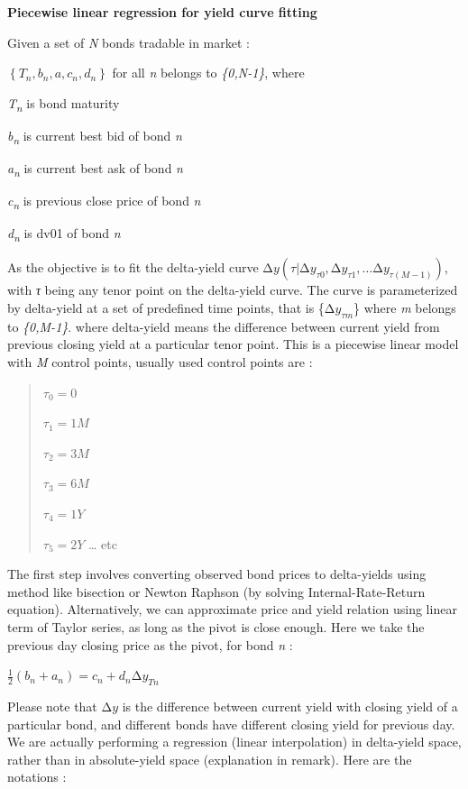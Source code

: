 \textbf{Piecewise linear regression for yield curve fitting}

Given a set of \emph{N} bonds tradable in market :

\(\left\{ T_{n},b_{n},a,c_{n},d_{n} \right\}\) for all \emph{n} belongs
to \emph{\{0,N-1\}}, where

\emph{T\textsubscript{n}} is bond maturity

\emph{b\textsubscript{n}} is current best bid of bond \emph{n}

\emph{a\textsubscript{n}} is current best ask of bond \emph{n}

\emph{c\textsubscript{n}} is previous close price of bond \emph{n}

\emph{d\textsubscript{n}} is dv01 of bond \emph{n}

As the objective is to fit the delta-yield curve
\(\mathrm{\Delta}y\left( \tau|{\mathrm{\Delta}y}_{\tau 0},{\mathrm{\Delta}y}_{\tau 1},\ldots{\mathrm{\Delta}y}_{\tau(M - 1)} \right)\),
with \emph{τ} being any tenor point on the delta-yield curve. The curve
is parameterized by delta-yield at a set of predefined time points, that
is \{\({\mathrm{\Delta}y}_{\tau m}\)\} where \emph{m} belongs to
\emph{\{0,M-1\}}. where delta-yield means the difference between current
yield from previous closing yield at a particular tenor point. This is a
piecewise linear model with \emph{M} control points, usually used
control points are :

\begin{quote}
\(\tau_{0} = 0\)

\(\tau_{1} = 1M\)

\(\tau_{2} = 3M\)

\(\tau_{3} = 6M\)

\(\tau_{4} = 1Y\)

\(\tau_{5} = 2Y\) \ldots{} etc
\end{quote}

The first step involves converting observed bond prices to delta-yields
using method like bisection or Newton Raphson (by solving
Internal-Rate-Return equation). Alternatively, we can approximate price
and yield relation using linear term of Taylor series, as long as the
pivot is close enough. Here we take the previous day closing price as
the pivot, for bond \emph{n} :

\(\frac{1}{2}(b_{n} + a_{n}) = c_{n} + d_{n}\mathrm{\Delta}y_{Tn}\)

Please note that \(\mathrm{\Delta}y\) is the difference between current
yield with closing yield of a particular bond, and different bonds have
different closing yield for previous day. We are actually performing a
regression (linear interpolation) in delta-yield space, rather than in
absolute-yield space (explanation in remark). Here are the notations :

